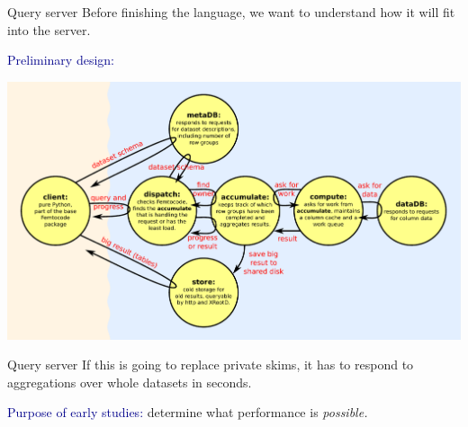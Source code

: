 \documentclass{beamer}
\begin{document}
\begin{frame}{Query server}
\vspace{0.4 cm}
Before finishing the language, we want to understand how it will fit into the server.

\vspace{0.2 cm}
\textcolor{darkblue}{Preliminary design:}

\vspace{0.2 cm}
\includegraphics[width=\linewidth]{distributed-system.pdf}
\end{frame}

\begin{frame}{Query server}
If this is going to replace private skims, it has to respond to aggregations over whole datasets in seconds.

\vfill
\textcolor{darkblue}{Purpose of early studies:} determine what performance is {\it possible.}
\end{frame}
\end{document}
